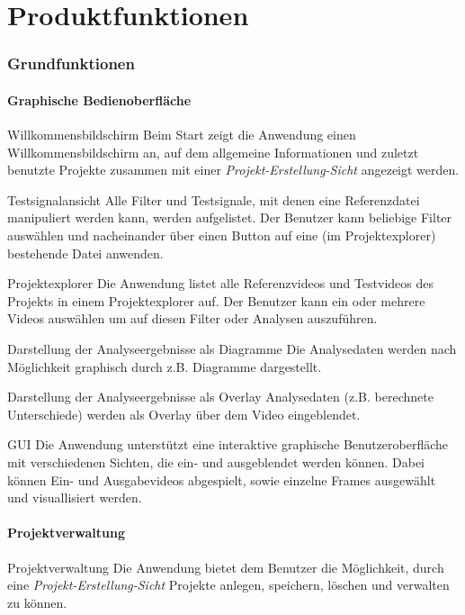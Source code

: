 \chapter {Produktfunktionen}

\subsection{Grundfunktionen}
\setcounter{counterKriterien}{0}

\subsubsection{Graphische Bedienoberfläche}
 Willkommensbildschirm
\newline
Beim Start zeigt die Anwendung einen Willkommensbildschirm an, auf dem allgemeine Informationen und zuletzt
 benutzte Projekte zusammen mit einer \emph{Projekt-Erstellung-Sicht} angezeigt werden.

 Testsignalansicht
\newline
Alle Filter und Testsignale, mit denen eine Referenzdatei manipuliert werden kann, werden aufgelistet. Der
 Benutzer kann beliebige Filter auswählen und nacheinander über einen Button auf eine (im Projektexplorer)
  bestehende Datei anwenden.

 Projektexplorer
\newline
Die Anwendung listet alle Referenzvideos und Testvideos des Projekts in einem Projektexplorer auf. Der
 Benutzer kann ein oder mehrere Videos auswählen um auf diesen Filter oder Analysen auszuführen.

 Darstellung der Analyseergebnisse als Diagramme
\newline
Die Analysedaten werden nach Möglichkeit graphisch durch z.B. Diagramme dargestellt.

 Darstellung der Analyseergebnisse als Overlay
\newline
Analysedaten (z.B. berechnete Unterschiede) werden als Overlay über dem Video eingeblendet.

 GUI
\newline
Die Anwendung unterstützt eine interaktive graphische Benutzeroberfläche mit verschiedenen Sichten, die ein-
 und ausgeblendet werden können. Dabei können Ein- und Ausgabevideos abgespielt, sowie einzelne Frames
  ausgewählt und visuallisiert werden.

\subsubsection{Projektverwaltung}
 Projektverwaltung
\newline
Die Anwendung bietet dem Benutzer die Möglichkeit, durch eine \emph{Projekt-Erstellung-Sicht} Projekte
 anlegen, speichern, löschen und verwalten zu können.

